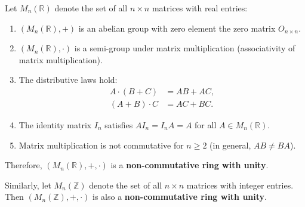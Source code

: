 \begin{example}
Let $M_n(\mathbb{R})$ denote the set of all $n \times n$ matrices with real entries:
\begin{enumerate}[label=(\roman*)]
    \item $(M_n(\mathbb{R}), +)$ is an abelian group with zero element the zero matrix $O_{n \times n}$.
    \item $(M_n(\mathbb{R}), \cdot)$ is a semi-group under matrix multiplication (associativity of matrix multiplication).
    \item The distributive laws hold:
    \begin{align*}
    A \cdot (B + C) &= AB + AC, \\
    (A + B) \cdot C &= AC + BC.
    \end{align*}
    \item The identity matrix $I_n$ satisfies $A I_n = I_n A = A$ for all $A \in M_n(\mathbb{R})$.
    \item Matrix multiplication is not commutative for $n \ge 2$ (in general, $AB \neq BA$).
\end{enumerate}
Therefore, $(M_n(\mathbb{R}), +, \cdot)$ is a \textbf{non-commutative ring with unity}.
\end{example}

\begin{example}
Similarly, let $M_n(\mathbb{Z})$ denote the set of all $n \times n$ matrices with integer entries. Then $(M_n(\mathbb{Z}), +, \cdot)$ is also a \textbf{non-commutative ring with unity}.
\end{example}
